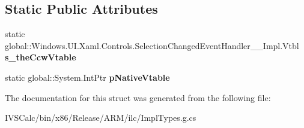 \subsection*{Static Public Attributes}
\begin{DoxyCompactItemize}
\item 
\mbox{\label{struct_windows_1_1_u_i_1_1_xaml_1_1_controls_1_1_selection_changed_event_handler_____impl_1_1_vtbl_a2428c8789be5ff11a6b169fbbf2c879c}} 
static global\+::\+Windows.\+U\+I.\+Xaml.\+Controls.\+Selection\+Changed\+Event\+Handler\+\_\+\+\_\+\+Impl.\+Vtbl {\bfseries s\+\_\+the\+Ccw\+Vtable}
\item 
\mbox{\label{struct_windows_1_1_u_i_1_1_xaml_1_1_controls_1_1_selection_changed_event_handler_____impl_1_1_vtbl_ae7fbbf2b57a187b3b22a9cc1850a616e}} 
static global\+::\+System.\+Int\+Ptr {\bfseries p\+Native\+Vtable}
\end{DoxyCompactItemize}


The documentation for this struct was generated from the following file\+:\begin{DoxyCompactItemize}
\item 
I\+V\+S\+Calc/bin/x86/\+Release/\+A\+R\+M/ilc/Impl\+Types.\+g.\+cs\end{DoxyCompactItemize}
